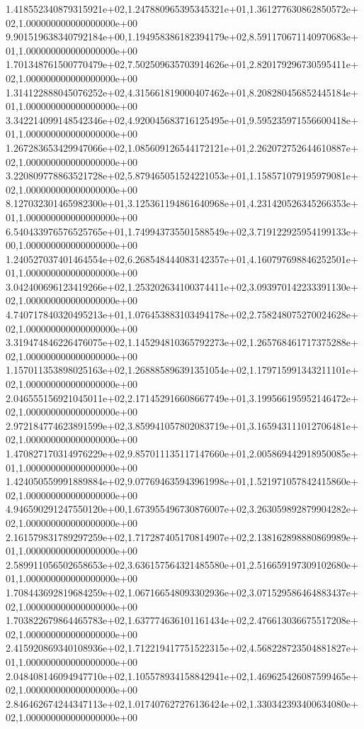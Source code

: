1.418552340879315921e+02,1.247880965395345321e+01,1.361277630862850572e+02,1.000000000000000000e+00
9.901519638340792184e+00,1.194958386182394179e+02,8.591170671140970683e+01,1.000000000000000000e+00
1.701348761500770479e+02,7.502509635703914626e+01,2.820179296730595411e+02,1.000000000000000000e+00
1.314122888045076252e+02,4.315661819000407462e+01,8.208280456852445184e+01,1.000000000000000000e+00
3.342214099148542346e+02,4.920045683716125495e+01,9.595235971556600418e+01,1.000000000000000000e+00
1.267283653429947066e+02,1.085609126544172121e+01,2.262072752644610887e+02,1.000000000000000000e+00
3.220809778863521728e+02,5.879465051524221053e+01,1.158571079195979081e+02,1.000000000000000000e+00
8.127032301465982300e+01,3.125361194861640968e+01,4.231420526345266353e+01,1.000000000000000000e+00
6.540433976576525765e+01,1.749943735501588549e+02,3.719122925954199133e+00,1.000000000000000000e+00
1.240527037401464554e+02,6.268548444083142357e+01,4.160797698846252501e+01,1.000000000000000000e+00
3.042400696123419266e+02,1.253202634100374411e+02,3.093970142233391130e+02,1.000000000000000000e+00
4.740717840320495213e+01,1.076453883103494178e+02,2.758248075270024628e+02,1.000000000000000000e+00
3.319474846226476075e+02,1.145294810365792273e+02,1.265768461717375288e+02,1.000000000000000000e+00
1.157011353898025163e+02,1.268885896391351054e+02,1.179715991343211101e+02,1.000000000000000000e+00
2.046555156921045011e+02,2.171452916608667749e+01,3.199566195952146472e+02,1.000000000000000000e+00
2.972184774623891599e+02,3.859941057802083719e+01,3.165943111012706481e+02,1.000000000000000000e+00
1.470827170314976229e+02,9.857011135117147660e+01,2.005869442918950085e+01,1.000000000000000000e+00
1.424050559991889884e+02,9.077694635943961998e+01,1.521971057842415860e+02,1.000000000000000000e+00
4.946590291247550120e+00,1.673955496730876007e+02,3.263059892879904282e+02,1.000000000000000000e+00
2.161579831789297259e+02,1.717287405170814907e+02,2.138162898880869989e+01,1.000000000000000000e+00
2.589911056502658653e+02,3.636157564321485580e+01,2.516659197309102680e+01,1.000000000000000000e+00
1.708443692819684259e+02,1.067166548093302936e+02,3.071529586464883437e+02,1.000000000000000000e+00
1.703822679864465783e+02,1.637774636101161434e+02,2.476613036675517208e+02,1.000000000000000000e+00
2.415920869340108936e+02,1.712219417751522315e+02,4.568228723504881827e+01,1.000000000000000000e+00
2.048408146094947710e+02,1.105578934158842941e+02,1.469625426087599465e+02,1.000000000000000000e+00
2.846462674244347113e+02,1.017407627276136424e+02,1.330342393400634080e+02,1.000000000000000000e+00

